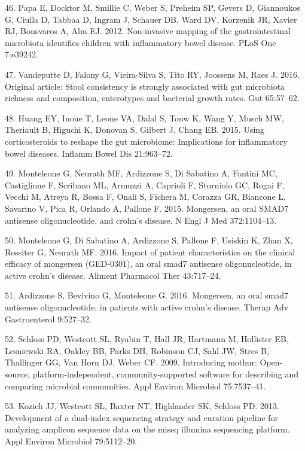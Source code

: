 \documentclass[12pt,]{article}
\begin{document}
\hypertarget{ref-papa_pedsIBD_2012}{}
46. Papa E, Docktor M, Smillie C, Weber S, Preheim SP, Gevers D,
Giannoukos G, Ciulla D, Tabbaa D, Ingram J, Schauer DB, Ward DV,
Korzenik JR, Xavier RJ, Bousvaros A, Alm EJ. 2012. Non-invasive mapping
of the gastrointestinal microbiota identifies children with inflammatory
bowel disease. PLoS One 7:e39242.

\hypertarget{ref-vandeputte_stoolcon_2016}{}
47. Vandeputte D, Falony G, Vieira-Silva S, Tito RY, Joossens M, Raes J.
2016. Original article: Stool consistency is strongly associated with
gut microbiota richness and composition, enterotypes and bacterial
growth rates. Gut 65:57--62.

\hypertarget{ref-huang_cort_2015}{}
48. Huang EY, Inoue T, Leone VA, Dalal S, Touw K, Wang Y, Musch MW,
Theriault B, Higuchi K, Donovan S, Gilbert J, Chang EB. 2015. Using
corticosteroids to reshape the gut microbiome: Implications for
inflammatory bowel diseases. Inflamm Bowel Dis 21:963--72.

\hypertarget{ref-monteleone_mongersen_2015}{}
49. Monteleone G, Neurath MF, Ardizzone S, Di Sabatino A, Fantini MC,
Castiglione F, Scribano ML, Armuzzi A, Caprioli F, Sturniolo GC, Rogai
F, Vecchi M, Atreya R, Bossa F, Onali S, Fichera M, Corazza GR, Biancone
L, Savarino V, Pica R, Orlando A, Pallone F. 2015. Mongersen, an oral
SMAD7 antisense oligonucleotide, and crohn's disease. N Engl J Med
372:1104--13.

\hypertarget{ref-monteleone_mongersen_2016}{}
50. Monteleone G, Di Sabatino A, Ardizzone S, Pallone F, Usiskin K, Zhan
X, Rossiter G, Neurath MF. 2016. Impact of patient characteristics on
the clinical efficacy of mongersen (GED-0301), an oral smad7 antisense
oligonucleotide, in active crohn's disease. Aliment Pharmacol Ther
43:717--24.

\hypertarget{ref-ardizzone_mongersen_2016}{}
51. Ardizzone S, Bevivino G, Monteleone G. 2016. Mongersen, an oral
smad7 antisense oligonucleotide, in patients with active crohn's
disease. Therap Adv Gastroenterol 9:527--32.

\hypertarget{ref-schloss_mothur_2009}{}
52. Schloss PD, Westcott SL, Ryabin T, Hall JR, Hartmann M, Hollister
EB, Lesniewski RA, Oakley BB, Parks DH, Robinson CJ, Sahl JW, Stres B,
Thallinger GG, Van Horn DJ, Weber CF. 2009. Introducing mothur:
Open-source, platform-independent, community-supported software for
describing and comparing microbial communities. Appl Environ Microbiol
75:7537--41.

\hypertarget{ref-Kozich_MiSeqSOP_2013}{}
53. Kozich JJ, Westcott SL, Baxter NT, Highlander SK, Schloss PD. 2013.
Development of a dual-index sequencing strategy and curation pipeline
for analyzing amplicon sequence data on the miseq illumina sequencing
platform. Appl Environ Microbiol 79:5112--20.
\end{document}
